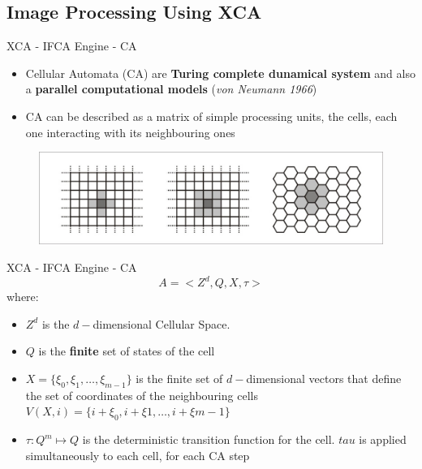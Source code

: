 \documentclass{beamer}
\begin{document}
	\subsection{Image Processing Using XCA}
		\begin{frame}{XCA - IFCA Engine - CA}
			\begin{itemize}
			\item Cellular Automata (CA) are \textbf{Turing complete dunamical system} and also a \textbf{parallel computational models} (\textit{von Neumann 1966})
			\item CA can be described as a matrix of simple processing units, the cells, each one interacting with its neighbouring ones

			\end{itemize}
					\begin{figure}
					\centering
					\includegraphics[scale=0.68]{./images/CA}
				\end{figure}
		\end{frame}
		\begin{frame}{XCA - IFCA Engine - CA}
		\[
			A = \Big<Z^d , Q, X, \tau \Big>		
		\] where:
		\begin{itemize}
		 \item $Z^d$ is the $d-$dimensional Cellular Space.
		 \item $Q$ is the \textbf{finite} set of states of the cell
		 \item $X = \{\xi_0, \xi_1, \ldots , \xi_{m-1}\}$ is the finite set of $d-$dimensional vectors that define the set of coordinates of the neighbouring cells $V(X,i)=\{i+\xi_0, i+\xi{1},\ldots, i+\xi{m-1}\}$

		 \item $\tau: Q^m \mapsto  Q$ is the deterministic transition function for the cell. $tau$ is applied simultaneously to each cell, for each CA step
		\end{itemize}
		\end{frame}
		
\end{document}
